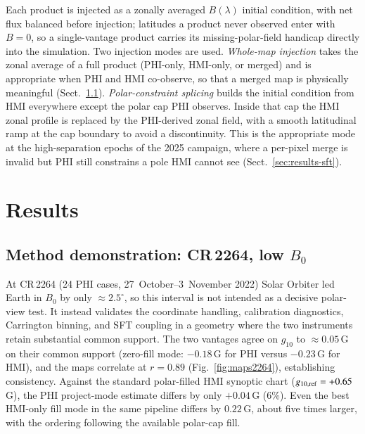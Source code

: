 \documentclass{aa}
\begin{document}
Each product is injected as a zonally averaged $B(\lambda)$ initial condition, with net flux balanced before injection; latitudes a product never observed enter with $B=0$, so a single-vantage product carries its missing-polar-field handicap directly into the simulation. Two injection modes are used. \emph{Whole-map injection} takes the zonal average of a full product (PHI-only, HMI-only, or merged) and is appropriate when PHI and HMI co-observe, so that a merged map is physically meaningful (Sect.~\ref{sec:results-demo}). \emph{Polar-constraint splicing} builds the initial condition from HMI everywhere except the polar cap PHI observes. Inside that cap the HMI zonal profile is replaced by the PHI-derived zonal field, with a smooth latitudinal ramp at the cap boundary to avoid a discontinuity. This is the appropriate mode at the high-separation epochs of the 2025 campaign, where a per-pixel merge is invalid but PHI still constrains a pole HMI cannot see (Sect.~\ref{sec:results-sft}).

\section{Results}
\label{sec:results}

\subsection{Method demonstration: CR\,2264, low $B_0$}
\label{sec:results-demo}

At CR\,2264 (24 PHI cases, 27~October--3~November 2022) Solar Orbiter led Earth in $B_0$ by only $\approx 2.5^{\circ}$, so this interval is not intended as a decisive polar-view test. It instead validates the coordinate handling, calibration diagnostics, Carrington binning, and SFT coupling in a geometry where the two instruments retain substantial common support. The two vantages agree on $g_{10}$ to $\approx 0.05$\,G on their common support (zero-fill mode: $-0.18$\,G for PHI versus $-0.23$\,G for HMI), and the maps correlate at $r = 0.89$ (Fig.~\ref{fig:maps2264}), establishing consistency. Against the standard polar-filled HMI synoptic chart ($g_{10,\rm ref} = +0.65$\,G), the PHI project-mode estimate differs by only $+0.04$\,G (6\%). Even the best HMI-only fill mode in the same pipeline differs by $0.22$\,G, about five times larger, with the ordering following the available polar-cap fill.
\end{document}
